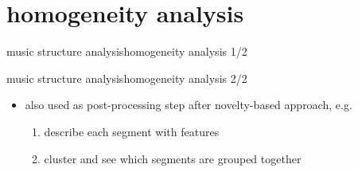    \section[homogeneity]{homogeneity analysis}
        \begin{frame}{music structure analysis}{homogeneity analysis 1/2}
        \end{frame}
        \begin{frame}{music structure analysis}{homogeneity analysis 2/2}
            \begin{itemize}
                \item   also used as post-processing step after novelty-based approach, e.g.
                    \begin{enumerate}
                        \item   describe each segment with features
                        \item   cluster and see which segments are grouped together
                    \end{enumerate}
            \end{itemize}
        \end{frame}
